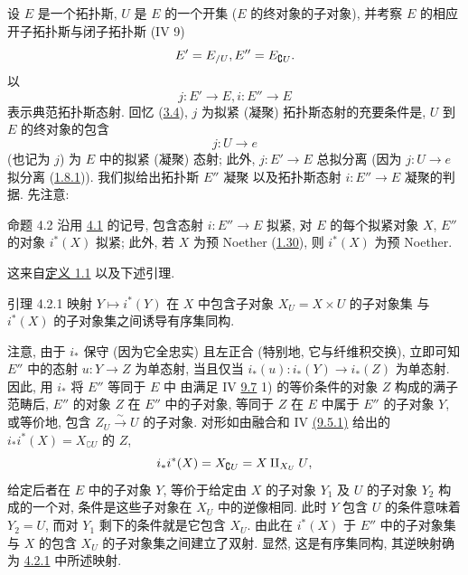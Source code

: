 \subsection{}
设 $E$ 是一个拓扑斯, $U$ 是 $E$ 的一个开集
(\ie $E$ 的终对象的子对象),
并考察 $E$ 的相应开子拓扑斯与闭子拓扑斯\pageoriginale{} (IV 9)
$$
E'= E_{/U}, E'' = E_{\complement U}{}.
$$
以
$$
j : E'\to E, i : E''\to E
$$
表示典范拓扑斯态射.
回忆 (\hyperref[VI.prop3.4]{3.4}),
$j$ 为拟紧 (\resp 凝聚) 拓扑斯态射的充要条件是,
$U$ 到 $E$ 的终对象的包含
$$
j : U \to e
$$
(也记为 $j$) 为 $E$ 中的拟紧 (\resp 凝聚) 态射;
此外, $j:E'\to E$ 总拟分离
(因为 $j:U\to e$ 拟分离 (\hyperref[VI.cor1.8.1]{1.8.1})).
我们拟给出拓扑斯 $E''$ 凝聚
以及拓扑斯态射 $i:E''\to E$ 凝聚的判据.
先注意:

\begin{enonce*}{命题 4.2}
沿用 \hyperref[VI.subsec4.1]{4.1} 的记号,
包含态射 $i:E''\to E$ 拟紧,
\ie 对 $E$ 的每个拟紧对象 $X$,
$E''$ 的对象 $i^{\ast}(X)$ 拟紧;
此外, 若 $X$ 为预 Noether
(\hyperref[VI.def1.30]{1.30}),
则 $i^{\ast}(X)$ 为预 Noether.
\end{enonce*}

这来自\hyperref[VI.def1.1]{定义 1.1} 以及下述引理.

\begin{enonce*}{引理 4.2.1}
映射\pageoriginale{} $Y\mapsto i^{\ast}(Y)$
在 $X$ 中包含子对象 $X_U=X\times U$ 的子对象集
与 $i^{\ast}(X)$ 的子对象集之间诱导有序集同构.
\end{enonce*}

注意, 由于 $i_{\ast}$ 保守
(因为它全忠实) 且左正合
(特别地, 它与纤维积交换),
立即可知 $E''$ 中的态射 $u:Y\to Z$ 为单态射,
当且仅当 $i_{\ast}(u):i_{\ast}(Y)\to i_{\ast}(Z)$ 为单态射.
因此, 用 $i_{\ast}$ 将 $E''$ 等同于 $E$ 中
由满足 IV \hyperref[IV.subsec9.7]{9.7} 1) 的等价条件的对象 $Z$
构成的满子范畴后,
$E''$ 的对象 $Z$ 在 $E''$ 中的子对象,
等同于 $Z$ 在 $E$ 中属于 $E''$ 的子对象 $Y$,
或等价地, 包含 $Z_U\xrightarrow{\sim}U$ 的子对象.
对形如由融合和 IV \hyperref[IV.subsubsec9.5.1]{(9.5.1)} 给出的
$i_{\ast}i^{\ast}(X)=X_{\complement U}$ 的 $Z$,
$$
i_{\ast} i^{\ast} (X) = X_{\complement U} = X \amalg_{X_U} U {},
$$
给定后者在 $E$ 中的子对象 $Y$,
等价于给定由 $X$ 的子对象 $Y_1$ 及 $U$ 的子对象 $Y_2$ 构成的一个对,
条件是这些子对象在 $X_U$ 中的逆像相同.
此时 $Y$ 包含 $U$ 的条件意味着 $Y_2=U$,
而对 $Y_1$ 剩下的条件就是它包含 $X_U$.
由此在 $i^{\ast}(X)$ 于 $E''$ 中的子对象集
与 $X$ 的包含 $X_U$ 的子对象集之间建立了双射.
显然\pageoriginale{}, 这是有序集同构,
其逆映射确为 \hyperref[VI.lem4.2.1]{4.2.1} 中所述映射.

